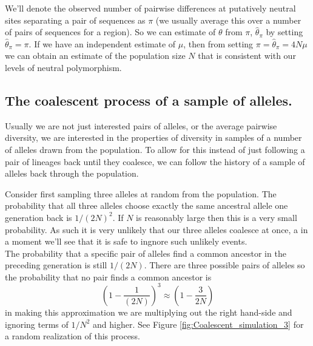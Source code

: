 We'll denote the observed number of pairwise differences at putatively
neutral sites separating a
pair of sequences as $\pi$ (we usually average this over a number of
pairs of sequences for a region). So we can estimate of
$\theta$ from $\pi$, $\widehat{\theta}_{\pi}$ by setting $\widehat{\theta}_{\pi}=\pi$.
If we have an independent
estimate of $\mu$, then from setting $\pi = \widehat{\theta}_{\pi} = 4N\mu$ we can obtain an
estimate of the population size $N$ that is consistent with our levels
of neutral polymorphism.



\subsection{The coalescent process of a sample of alleles.}

Usually we are not just interested pairs of alleles, or the
average pairwise diversity, we are interested in the properties of
diversity in samples of a number of alleles drawn from the population.  
To allow for this instead of just following a pair of lineages back until they
coalesce, we can follow the history of a sample of alleles back
through the population.

Consider first sampling three alleles at random from the
population. The probability that all three alleles choose exactly the
same ancestral allele one generation back is $1/(2N)^2$. If $N$ is
reasonably large then this is a very small probability. As such it is
very unlikely that our three alleles coalesce at once, a in a moment
we'll see that it is safe to ingnore such unlikely events. \\

The
probability that a specific pair of alleles find a common ancestor in
the preceding generation is still $1/(2N)$. There are three possible
pairs of alleles so the probability that no pair finds a common
ancestor is
\begin{equation}
\left(1-\frac{1}{(2N)} \right)^3 \approx \left( 1- \frac{3}{2N} \right)
\end{equation}
in making this approximation we are multiplying out the right hand-side
and ignoring terms of $1/N^2$ and higher. See
Figure \ref{fig:Coalescent_simulation_3} for a random realization of this process. \\


